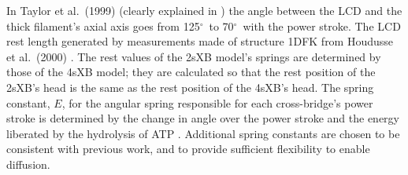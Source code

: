 \documentclass[10pt]{article}
\newcommand{\citep}[1]{\cite{#1}} %
\newcommand{\de}{$^\circ$~} %
\begin{document}
\begin{table}[ht]
\begin{center}
{	    In Taylor et al.~(1999) \citep{Taylor1999} (clearly explained in \citep{Davis2009}) the angle between the LCD and the thick filament's axial axis goes from 125\de to 70\de with the power stroke. 
	    The LCD rest length generated by measurements made of structure 1DFK from Houdusse et al.~(2000) \citep{Houdusse2000}. 
	    The rest values of the 2sXB model's springs are determined by those of the 4sXB model; they are calculated so that the rest position of the 2sXB's head is the same as the rest position of the 4sXB's head. 
	    The spring constant, $E$, for the angular spring responsible for each cross-bridge's power stroke is determined by the change in angle over the power stroke and the energy liberated by the hydrolysis of ATP \citep{Tanner2007}. 
	    Additional spring constants are chosen to be consistent with previous work, and to provide sufficient flexibility to enable diffusion. 
    }
    \end{center}
\end{table}

\end{document}
